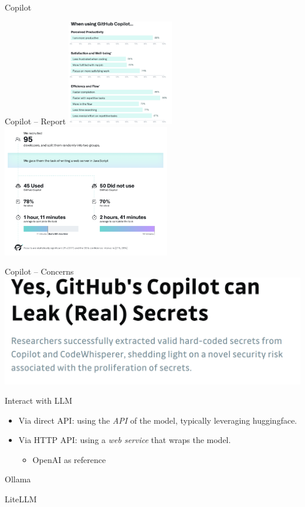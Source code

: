 \documentclass[presentation, 10pt]{beamer}\mode<presentation>{\usetheme{AMSBolognaFC}}
\begin{document}
\begin{frame}{Copilot}

\end{frame}
\begin{frame}{Copilot -- Report}
\includegraphics[width=0.35\textwidth]{img/copilot-report-1.png}
\includegraphics[width=0.55\textwidth]{img/copilot-report-2.png}
\end{frame}
\begin{frame}{Copilot -- Concerns}
\includegraphics[width=\textwidth]{img/copilot-concerns.png}
\end{frame}

\begin{frame}{Interact with LLM}
	\begin{itemize}
		\item Via direct API: using the \emph{API} of the model, typically leveraging huggingface.
		\item Via HTTP API: using a \emph{web service} that wraps the model.
		\begin{itemize}
			\item OpenAI as reference
		\end{itemize}
	\end{itemize}
\end{frame}
\begin{frame}{Ollama}

\end{frame}
\begin{frame}{LiteLLM}

\end{frame}
\end{document}

